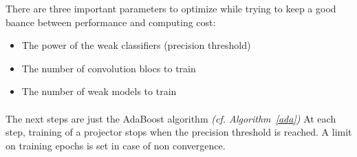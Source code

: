 \documentclass[11 pt]{article}
\begin{document}
There are three important parameters to optimize while trying to keep a good baance between performance and computing cost:\\
\medskip
\begin{itemize}
  \item The power of the weak classifiers (precision threshold)
  \item The number of convolution blocs to train 
  \item The number of weak models to train
\end{itemize}

\paragraph{}The next steps are just the AdaBoost algorithm \textit{(cf. Algorithm~\ref{ada})}
At each step, training of a projector stops when the precision threshold is reached. A limit on training epochs is set in case of non convergence.
\medskip
\end{document}
